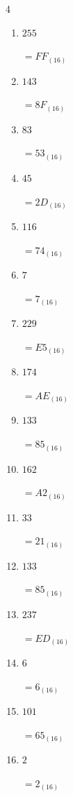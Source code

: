 \begin{multicols}{4}
\begin{enumerate}
\columnbreak %

  \item $255$

        $=FF_{(16)}$

  \item $143$

        $=8F_{(16)}$

  \item $83$

        $=53_{(16)}$

  \item $45$

        $=2D_{(16)}$

  \item $116$

        $=74_{(16)}$

  \item $7$

        $=7_{(16)}$

  \item $229$

        $=E5_{(16)}$

  \item $174$

        $=AE_{(16)}$

  \item $133$

        $=85_{(16)}$

  \item $162$

        $=A2_{(16)}$

  \item $33$

        $=21_{(16)}$

  \item $133$

        $=85_{(16)}$

  \item $237$

        $=ED_{(16)}$

  \item $6$

        $=6_{(16)}$

  \item $101$

        $=65_{(16)}$

\columnbreak %

  \item $2$

        $=2_{(16)}$


\end{enumerate}
\end{multicols}

